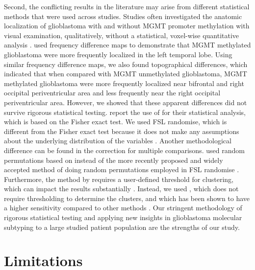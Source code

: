 Second, the conflicting results in the literature may arise from different statistical methods that were used across studies.
Studies often investigated the anatomic localization of glioblastoma with and without \gls{MGMT} promoter methylation with visual examination, qualitatively, without a statistical, voxel-wise quantitative analysis \autocite{carillo2012relationship,eoli2007methylation,han2018structural,drabycz2010analysis}.
 used frequency difference maps to demonstrate that \gls{MGMT} methylated glioblastoma were more frequently localized in the left temporal lobe.
Using similar frequency difference maps, we also found topographical differences, which indicated that when compared with \gls{MGMT} unmethylated glioblastoma, \gls{MGMT} methylated glioblastoma were more frequently localized near bifrontal and right occipital periventricular area and less frequently near the right occipital periventricular area.
However, we showed that these apparent differences did not survive rigorous statistical testing.
 report the use of  for their statistical analysis, which is based on the Fisher exact test.
We used \gls{FSL} randomise, which is different from the Fisher exact test because it does not make any assumptions about the underlying distribution of the variables \autocite{winkler2014permutation}.
Another methodological difference can be found in the correction for multiple comparisons.
 used random permutations based on  instead of the more recently proposed and widely accepted method of doing random permutations employed in \gls{FSL} randomise \autocite{winkler2014permutation}.
Furthermore, the method by  requires a user-defined threshold for clustering, which can impact the results substantially \autocite{bullmore1999global}.
Instead, we used , which does not require thresholding to determine the clusters, and which has been shown to have a higher sensitivity compared to other methods \autocite{smith2009threshold}.
Our stringent methodology of rigorous statistical testing and applying new insights in glioblastoma molecular subtyping to a large studied patient population are the strengths of our study.

\section{Limitations}

